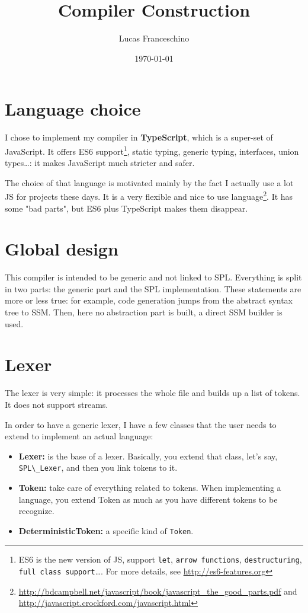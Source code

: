 \documentclass{article}
\title{Compiler Construction}
\date{\today}
\author{Lucas Franceschino}
\newcommand\cc[1]{\lstinline{#1}}
\begin{document}
	\maketitle
	\tableofcontents
	\newpage
	\section{Language choice}
		I chose to implement my compiler in \textbf{TypeScript}, which is a super-set of JavaScript. It offers ES6 support\footnote{ES6 is the new version of JS, support \cc{let}, \cc{arrow functions}, \cc{destructuring}, \cc{full class support}\dots. For more details, see \url{http://es6-features.org} }, static typing, generic typing, interfaces, union types\dots : it makes JavaScript much stricter and safer.

		The choice of that language is motivated mainly by the fact I actually use a lot JS for projects these days. It is a very flexible and nice to use language\footnote{\url{http://bdcampbell.net/javascript/book/javascript_the_good_parts.pdf} and \url{http://javascript.crockford.com/javascript.html}}. It has some "bad parts", but ES6 plus TypeScript makes them disappear.
	\section{Global design}
		This compiler is intended to be generic and not linked to SPL. Everything is split in two parts: the generic part and the SPL implementation. These statements are more or less true: for example, code generation jumps from the abstract syntax tree to SSM. Then, here no abstraction part is built, a direct SSM builder is used.
	\section{Lexer}
		The lexer is very simple: it processes the whole file and builds up a list of tokens. It does not support streams.
		
		In order to have a generic lexer, I have a few classes that the user needs to extend to implement an actual language:
		\begin{itemize}
			\item \textbf{Lexer:} is the base of a lexer. Basically, you extend that class, let's say, \cc{SPL\_Lexer}, and then you link tokens to it.
			\item \textbf{Token:} take care of everything related to tokens. When implementing a language, you extend Token as much as you have different tokens to be recognize.
			\item \textbf{DeterministicToken:}\label{detToken} a specific kind of \cc{Token}.
		\end{itemize}
\end{document}
